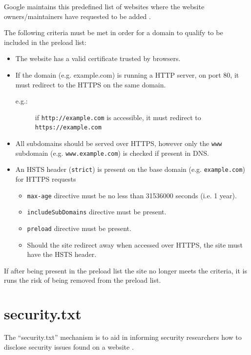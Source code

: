 \documentclass{mscreport}
\begin{document}
\vspace{0.3cm} \noindent
Google maintains this predefined list of websites where the website owners/maintainers have requested to be added \cite{Hodges2012-pe}.

\vspace{0.3cm} \noindent
The following criteria must be met in order for a domain to qualify to be included in the preload list:

\begin{itemize}
	\setlength\itemsep{0.1em}
	\item The website has a valid certificate trusted by browsers.
	\item If the domain (e.g. example.com) is running a HTTP server, on port 80, it must redirect to the HTTPS on the same domain.
	\begin{description}
	\item[e.g.:] if \texttt{http://example.com} is accessible, it must redirect to \texttt{https://example.com}
	\end{description}
	\item All subdomains should be served over HTTPS, however only the \texttt{www} subdomain (e.g. \texttt{www.example.com}) is checked if present in DNS.
	\item An HSTS header (\texttt{strict}) is present on the base domain (e.g. \texttt{example.com}) for HTTPS requests
	\begin{itemize}
		\item \texttt{max-age} directive must be no less than 31536000 seconds (i.e. 1 year).
		\item \texttt{includeSubDomains} directive must be present.
		\item \texttt{preload} directive must be present.
		\item Should the site redirect away when accessed over HTTPS, the site must have the HSTS header.
	\end{itemize}	
\end{itemize}

\vspace{0.3cm} \noindent
If after being present in the preload list the site no longer meets the criteria, it is runs the risk of being removed from the preload list.

\section{security.txt}
\label{section:security_txt}

The ``security.txt'' mechanism is to aid in informing security researchers how to disclose security issues found on a website \cite{Foudil2021-vh}.
\end{document}

